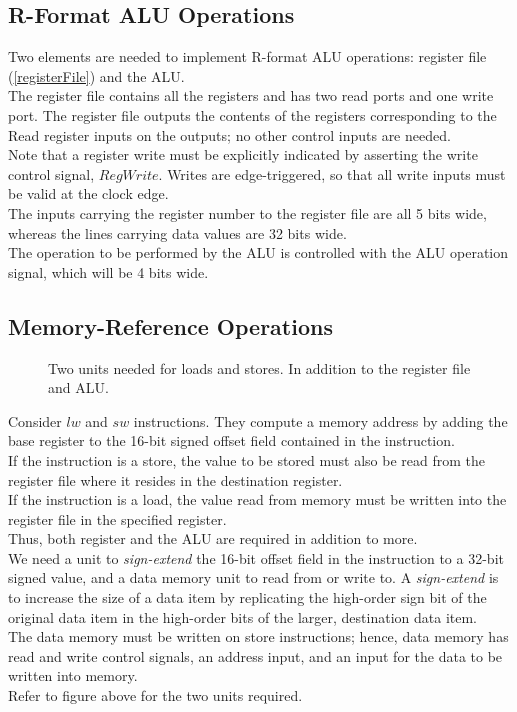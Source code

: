 \documentclass[12pt]{article}
\theoremstyle{definition}
\newcommand{\includePicture}[3]{
  \begin{figure}[!ht]
  \centering
  \scalebox{#1}{\texttt{[image: \#2]}}
  \caption{#3}
  \end{figure}
}
\begin{document}
  \subsection{R-Format ALU Operations}
  Two elements are needed to implement R-format ALU operations: register file (\ref{registerFile}) and the ALU. \\

  The register file contains all the registers and has two read ports and one write port.
  The register file outputs the contents of the registers corresponding to the Read register inputs on the outputs; no other control inputs are needed. \\
  Note that a register write must be explicitly indicated by asserting the write control signal, $RegWrite$.
  Writes are edge-triggered, so that all write inputs must be valid at the clock edge. \\

  The inputs carrying the register number to the register file are all 5 bits wide, whereas the lines carrying data values are 32 bits wide. \\
  The operation to be performed by the ALU is controlled with the ALU operation signal, which will be 4 bits wide.

  \subsection{Memory-Reference Operations}
  \includePicture{0.75}{pictures/elementsFormemoryReference.png}{Two units needed for loads and stores. In addition to the register file and ALU.}
  Consider $lw$ and $sw$ instructions.
  They compute a memory address by adding the base register to the 16-bit signed offset field contained in the instruction. \\
  If the instruction is a store, the value to be stored must also be read from the register file where it resides in the destination register. \\
  If the instruction is a load, the value read from memory must be written into the register file in the specified register. \\
  Thus, both register and the ALU are required in addition to more. \\

  We need a unit to \emph{sign-extend} the 16-bit offset field in the instruction to a 32-bit signed value, and a data memory unit to read from or write to.
  A \emph{sign-extend} is to increase the size of a data item by replicating the high-order sign bit of the original data item in the high-order bits of the larger, destination data item. \\
  The data memory must be written on store instructions; hence, data memory has read and write control signals, an address input, and an input for the data to be written into memory. \\
  Refer to figure above for the two units required.
\end{document}
